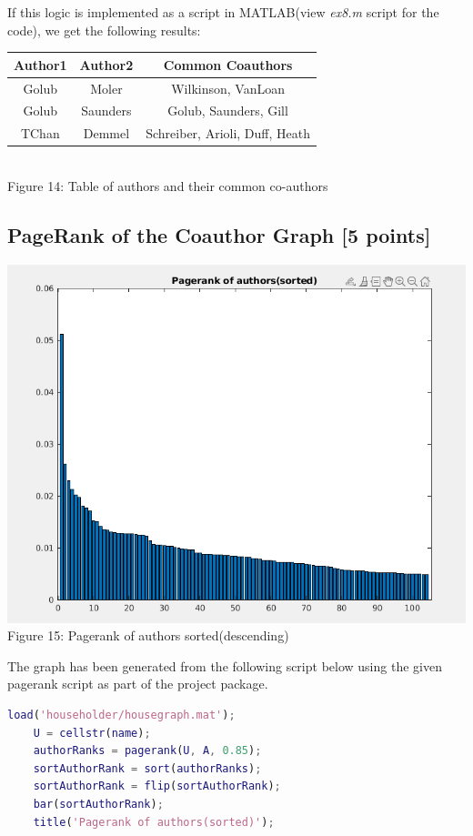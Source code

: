 \documentclass[unicode,11pt,a4paper,oneside,numbers=endperiod,openany]{scrartcl}
\begin{document}
{If this logic is implemented as a script in MATLAB(view \textit{ex8.m} script for the code), we get the following results:}\\

\begin{center}
\begin{tabular}{| c | c | c |}
\hline
 Author1 & Author2 & Common Coauthors \\
 \hline
 Golub & Moler & Wilkinson, VanLoan \\
 \hline
 Golub & Saunders & Golub, Saunders, Gill \\
 \hline
 TChan & Demmel & Schreiber, Arioli, Duff, Heath\\
 \hline
\end{tabular}\\
\vspace{5px}
{Figure 14: Table of authors and their common co-authors}\\
\end{center}

\newpage

\subsection{PageRank of the Coauthor Graph [5 points]}

\begin{center}
  \includegraphics[width=0.5\linewidth]{./images/ex9.png}\\
  \label{fig:Pagerank of authors sorted(descending)}
  {Figure 15: Pagerank of authors sorted(descending)}
\end{center}

{The graph has been generated from the following script below using the given pagerank script as part of the project package.}
\vspace{10px}

\begin{lstlisting}[language=Matlab]
    load('householder/housegraph.mat');
    U = cellstr(name);
    authorRanks = pagerank(U, A, 0.85);
    sortAuthorRank = sort(authorRanks);
    sortAuthorRank = flip(sortAuthorRank);
    bar(sortAuthorRank);
    title('Pagerank of authors(sorted)');
        
\end{lstlisting}
\vspace{10px}
\end{document}
